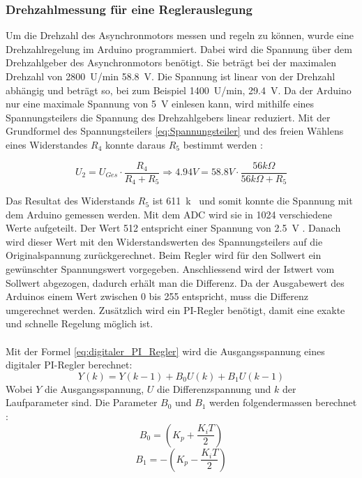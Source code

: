 \subsubsection{Drehzahlmessung für eine Reglerauslegung}
Um die Drehzahl des Asynchronmotors messen und regeln zu können, wurde eine Drehzahlregelung im Arduino programmiert. Dabei wird die Spannung über dem Drehzahlgeber des Asynchronmotors benötigt. Sie beträgt bei der maximalen Drehzahl von \SI{2800}{U/min} \SI{58.8}{V}. Die Spannung ist linear von der Drehzahl abhängig und beträgt so, bei zum Beispiel \SI{1400}{U/min}, \SI{29.4}{V}. Da der Arduino nur eine maximale Spannung von \SI{5}{V} einlesen kann, wird mithilfe eines Spannungsteilers die Spannung des Drehzahlgebers linear reduziert. Mit der Grundformel des Spannungsteilers \ref{eq:Spannungsteiler} und des freien Wählens eines Widerstandes $R_4$ konnte daraus $R_5$ bestimmt werden \cite{Spannungsteiler}:

\begin{equation}\label{eq:Spannungsteiler}
U_2=U_{Ges} \cdot\frac{R_4}{R_4 + R_5} \Longrightarrow 4.94 V = 58.8 V \cdot \frac{56k\Omega}{56k\Omega + R_5}
\end{equation}

Das Resultat des Widerstands $R_5$ ist \SI{611}{k\Omega} und somit konnte die Spannung mit dem Arduino gemessen werden. Mit dem ADC wird sie in 1024 verschiedene Werte aufgeteilt. Der Wert 512 entspricht  einer Spannung von \SI{2.5}{V} \cite{Spannungsmessung}. Danach wird dieser Wert mit den Widerstandswerten des Spannungsteilers auf die Originalspannung zurückgerechnet. Beim Regler wird für den Sollwert ein gewünschter Spannungswert vorgegeben. Anschliessend wird der Istwert vom Sollwert abgezogen, dadurch erhält man die Differenz. Da der Ausgabewert des Arduinos einem Wert zwischen 0 bis 255 entspricht, muss die Differenz umgerechnet werden. Zusätzlich wird ein PI-Regler benötigt, damit eine exakte und schnelle Regelung möglich ist.\\\\
Mit der Formel \ref{eq:digitaler_PI_Regler} wird die Ausgangsspannung eines digitaler PI-Regler berechnet: \cite{Quelle_Marco} 
\begin{equation}\label{eq:digitaler_PI_Regler}
Y(k) = Y(k-1)+ B_0U(k)+B_1U(k-1)
\end{equation}
Wobei $Y$ die Ausgangsspannung, $U$ die Differenzspannung und $k$ der Laufparameter sind. Die Parameter $B_0$ und $B_1$ werden folgendermassen berechnet \cite{PI_Regler}:
\begin{equation}\label{eq:B0}
B_0 = \left(K_p + \frac{K_iT}{2}\right) 
\end{equation}
\begin{equation}\label{eq:B1}
B_1 = -\left(K_p - \frac{K_iT}{2}\right) 
\end{equation}

